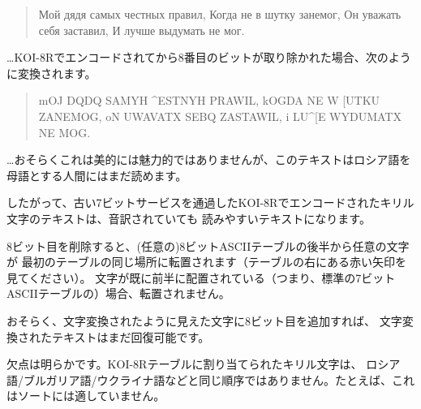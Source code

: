 \begin{framed}
\begin{quotation}
Мой дядя самых честных правил, Когда не в шутку занемог, Он уважать себя заставил, И лучше выдумать не мог.
\end{quotation}
\end{framed}

\dots KOI-8Rでエンコードされてから8番目のビットが取り除かれた場合、次のように変換されます。

\begin{framed}
\begin{quotation}
mOJ DQDQ SAMYH \^{}ESTNYH PRAWIL, kOGDA NE W [UTKU ZANEMOG, oN UWAVATX SEBQ ZASTAWIL, i LU\^{}[E WYDUMATX NE MOG.
\end{quotation}
\end{framed}

\dots おそらくこれは美的には魅力的ではありませんが、このテキストはロシア語を母語とする人間にはまだ読めます。

したがって、古い7ビットサービスを通過したKOI-8Rでエンコードされたキリル文字のテキストは、音訳されていても
読みやすいテキストになります。

8ビット目を削除すると、(任意の)8ビット\ac{ASCII}テーブルの後半から任意の文字が
最初のテーブルの同じ場所に転置されます（テーブルの右にある赤い矢印を見てください）。
文字が既に前半に配置されている（つまり、標準の7ビット\ac{ASCII}テーブルの）場合、転置されません。

おそらく、文字変換されたように見えた文字に8ビット目を追加すれば、
文字変換されたテキストはまだ回復可能です。

欠点は明らかです。KOI-8Rテーブルに割り当てられたキリル文字は、
ロシア語/ブルガリア語/ウクライナ語などと同じ順序ではありません。たとえば、これはソートには適していません。
